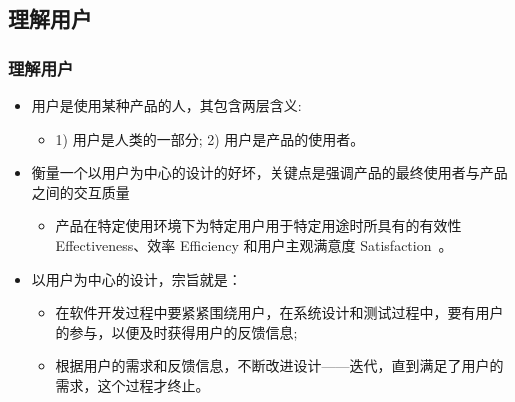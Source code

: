 \documentclass{beamer}
\newcommand{\fullPageImage}[2]{
	{
		\usebackgroundtemplate{\texttt{[image: \#1]}}
		\frame[plain]{#2}
	}
}
\begin{document}
\subsection{理解用户}
\begin{frame}
	\frametitle{理解用户}
	\beamertemplatetransparentcovereddynamicmedium
	\begin{itemize}[<+->]
		\item 用户是使用某种产品的人，其包含两层含义:
		\begin{itemize}
			\item 1) 用户是人类的一部分; 2) 用户是产品的使用者。
		\end{itemize}
		\item 衡量一个以用户为中心的设计的好坏，关键点是强调产品的最终使用者与产品之间的交互质量
		\begin{itemize}
			\item {\tiny 产品在特定使用环境下为特定用户用于特定用途时所具有的}有效性 Effectiveness、效率 Efficiency 和用户主观满意度 Satisfaction~\cite{iso19989241}。
		\end{itemize}
		\item 以用户为中心的设计，宗旨就是：
		\begin{itemize}
			\item {\tiny 在软件开发过程中要紧紧围绕用户，在系统设计和测试过程中，}要有用户的参与，{\tiny 以便及时获得用户的反馈信息;}
			\item {\tiny 根据用户的需求和反馈信息，}不断改进设计——迭代，{\tiny 直到满足了用户的需求，这个过程才终止。}
		\end{itemize}
	\end{itemize}
\end{frame}

\fullPageImage{images/usability-vs-user-experience.jpg}{}

\end{document}
